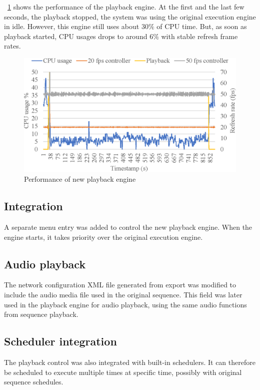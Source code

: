 \documentclass[journal]{IEEEtran}
\newcommand{\fref}[1]{\figurename~\ref{#1}}
\begin{document}

\fref{fig:playback} shows the performance of the playback engine. At the first and the last few seconds, the playback stopped, the system was using the original execution engine in idle. However, this engine still uses about $30 \%$ of CPU time. But, as soon as playback started, CPU usages drops to around $6 \%$ with stable refresh frame rates.

\begin{figure}[t]
    \centering
    \includegraphics[width=0.8\columnwidth]{playback}
    \caption{Performance of new playback engine}
    \label{fig:playback}
\end{figure}

\subsection{Integration}

A separate menu entry was added to control the new playback engine. When the engine starts, it takes priority over the original execution engine.

\subsection{Audio playback}

The network configuration XML file generated from export was modified to include the audio media file used in the original sequence. This field was later used in the playback engine for audio playback, using the same audio functions from sequence playback. 

\subsection{Scheduler integration}

The playback control was also integrated with built-in schedulers. It can therefore be scheduled to execute multiple times at specific time, possibly with original sequence schedules. 
\end{document}
